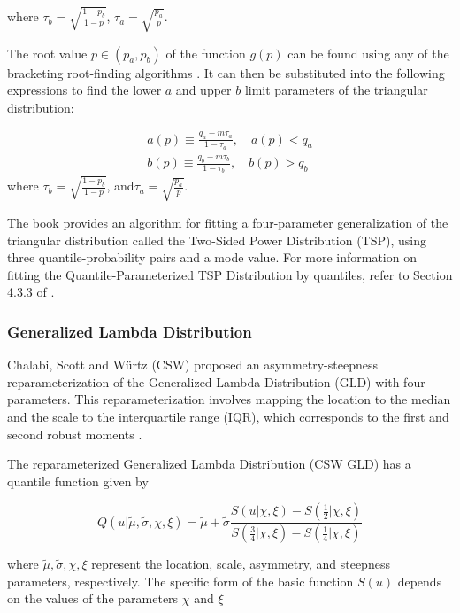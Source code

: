 \documentclass[
  fleqn,
  deca,
  blindrev
]{informs4}
\begin{document}
where \(\tau_b=\sqrt{\frac{1-p_b}{1-p}}\),
\(\tau_a=\sqrt{\frac{p_a}{p}}\).

The root value \(p\in (p_a,p_b)\) of the function \(g(p)\) can be found
using any of the bracketing root-finding algorithms
\citep{perepolkin2023TenetsQuantilebasedInference}. It can then be
substituted into the following expressions to find the lower \(a\) and
upper \(b\) limit parameters of the triangular distribution:

\[
\begin{gathered}
a(p) \equiv \frac{q_a-m\tau_a}{1-\tau_a}, \quad a(p)<q_a\\
b(p) \equiv \frac{q_b-m\tau_b}{1-\tau_b}, \quad b(p)>q_b
\end{gathered}
\] where \(\tau_b=\sqrt{\frac{1-p_b}{1-p}}\),
and\(\tau_a=\sqrt{\frac{p_a}{p}}\).

The book \citep{kotz2004BetaOtherContinuous} provides an algorithm for
fitting a four-parameter generalization of the triangular distribution
called the Two-Sided Power Distribution (TSP), using three
quantile-probability pairs and a mode value. For more information on
fitting the Quantile-Parameterized TSP Distribution by quantiles, refer
to Section 4.3.3 of \citep{kotz2004BetaOtherContinuous}.

\subsubsection{Generalized Lambda Distribution}\label{sec-gld}

Chalabi, Scott and Würtz (CSW)
\citep{chalabi2012FlexibleDistributionModeling} proposed an
asymmetry-steepness reparameterization of the Generalized Lambda
Distribution (GLD) \citep{freimer1988StudyGeneralizedTukey} with four
parameters. This reparameterization involves mapping the location to the
median and the scale to the interquartile range (IQR), which corresponds
to the first and second robust moments
\citep{kim2004MoreRobustEstimation, moors1988QuantileAlternativeKurtosis}.

The reparameterized Generalized Lambda Distribution (CSW GLD) has a
quantile function given by

\[
Q(u\vert\tilde\mu,\tilde\sigma,\chi,\xi)=\tilde\mu+\tilde\sigma\frac{S\left(u\vert\chi,\xi\right)-S\left(\frac{1}{2}\vert\chi,\xi\right)}{S\left(\frac{3}{4}\vert\chi,\xi\right)-S\left(\frac{1}{4}\vert\chi,\xi\right)}
\]

where \(\tilde\mu,\tilde\sigma,\chi,\xi\) represent the location, scale,
asymmetry, and steepness parameters, respectively. The specific form of
the basic function \(S(u)\) depends on the values of the parameters
\(\chi\) and \(\xi\)
\end{document}
